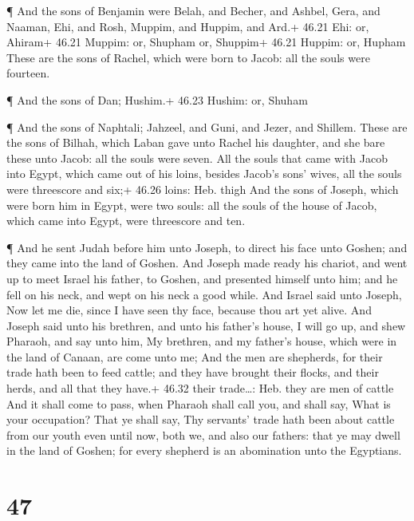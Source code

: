  ¶ And the sons of Benjamin were Belah, and Becher, and
Ashbel, Gera, and Naaman, Ehi, and Rosh, Muppim, and Huppim, and Ard.+
46.21 Ehi: or, Ahiram+ 46.21 Muppim: or, Shupham or, Shuppim+ 46.21
Huppim: or, Hupham  These are the sons of Rachel, which
were born to Jacob: all the souls were fourteen.

 ¶ And the sons of Dan; Hushim.+ 46.23 Hushim: or, Shuham

 ¶ And the sons of Naphtali; Jahzeel, and Guni, and Jezer,
and Shillem.  These are the sons of Bilhah, which Laban
gave unto Rachel his daughter, and she bare these unto Jacob: all the
souls were seven.  All the souls that came with Jacob into
Egypt, which came out of his loins, besides Jacob's sons' wives, all the
souls were threescore and six;+ 46.26 loins: Heb. thigh 
And the sons of Joseph, which were born him in Egypt, were two souls:
all the souls of the house of Jacob, which came into Egypt, were
threescore and ten.

 ¶ And he sent Judah before him unto Joseph, to direct his
face unto Goshen; and they came into the land of Goshen. 
And Joseph made ready his chariot, and went up to meet Israel his
father, to Goshen, and presented himself unto him; and he fell on his
neck, and wept on his neck a good while.  And Israel said
unto Joseph, Now let me die, since I have seen thy face, because thou
art yet alive.  And Joseph said unto his brethren, and unto
his father's house, I will go up, and shew Pharaoh, and say unto him, My
brethren, and my father's house, which were in the land of Canaan, are
come unto me;  And the men are shepherds, for their trade
hath been to feed cattle; and they have brought their flocks, and their
herds, and all that they have.+ 46.32 their trade\ldots: Heb. they are
men of cattle  And it shall come to pass, when Pharaoh
shall call you, and shall say, What is your occupation? 
That ye shall say, Thy servants' trade hath been about cattle from our
youth even until now, both we, and also our fathers: that ye may dwell
in the land of Goshen; for every shepherd is an abomination unto the
Egyptians.

\hypertarget{section-46}{%
\section{47}\label{section-46}}

